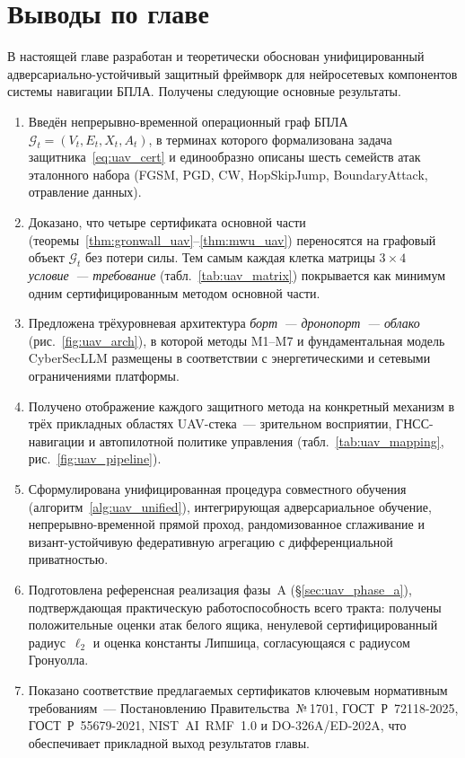 \section{Выводы по главе}
\label{sec:uav_conclusion}

В настоящей главе разработан и теоретически обоснован унифицированный
адверсариально-устойчивый защитный фреймворк для нейросетевых
компонентов системы навигации БПЛА. Получены следующие основные
результаты.
\begin{enumerate}\setlength\itemsep{0.1em}
\item Введён непрерывно-временной операционный граф БПЛА
$\mathcal{G}_t = (V_t,E_t,X_t,A_t)$, в терминах которого
формализована задача защитника~\eqref{eq:uav_cert} и единообразно
описаны шесть семейств атак эталонного набора (FGSM, PGD, CW,
HopSkipJump, BoundaryAttack, отравление данных).
\item Доказано, что четыре сертификата основной части
(теоремы~\ref{thm:gronwall_uav}--\ref{thm:mwu_uav}) переносятся на
графовый объект $\mathcal{G}_t$ без потери силы. Тем самым каждая
клетка матрицы $3\times4$ \emph{условие~--- требование}
(табл.~\ref{tab:uav_matrix}) покрывается как минимум одним
сертифицированным методом основной части.
\item Предложена трёхуровневая архитектура \emph{борт~--- дронопорт~---
облако} (рис.~\ref{fig:uav_arch}), в которой методы
\textsf{M1}--\textsf{M7} и фундаментальная модель \textsf{CyberSecLLM}
размещены в соответствии с энергетическими и сетевыми ограничениями
платформы.
\item Получено отображение каждого защитного метода на конкретный
механизм в трёх прикладных областях UAV-стека~--- зрительном
восприятии, ГНСС-навигации и автопилотной политике управления
(табл.~\ref{tab:uav_mapping}, рис.~\ref{fig:uav_pipeline}).
\item Сформулирована унифицированная процедура совместного
обучения (алгоритм~\ref{alg:uav_unified}), интегрирующая
адверсариальное обучение, непрерывно-временной прямой проход,
рандомизованное сглаживание и визант-устойчивую федеративную
агрегацию с дифференциальной приватностью.
\item Подготовлена референсная реализация фазы~A
(\S\ref{sec:uav_phase_a}), подтверждающая практическую
работоспособность всего тракта: получены положительные оценки атак
белого ящика, ненулевой сертифицированный радиус~$\ell_2$ и оценка
константы Липшица, согласующаяся с радиусом Гронуолла.
\item Показано соответствие предлагаемых сертификатов ключевым
нормативным требованиям~--- Постановлению Правительства~№\,1701,
\mbox{ГОСТ~Р~72118-2025}, \mbox{ГОСТ~Р~55679-2021},
\mbox{NIST~AI~RMF~1.0} и \mbox{DO-326A/ED-202A}, что обеспечивает
прикладной выход результатов главы.
\end{enumerate}

